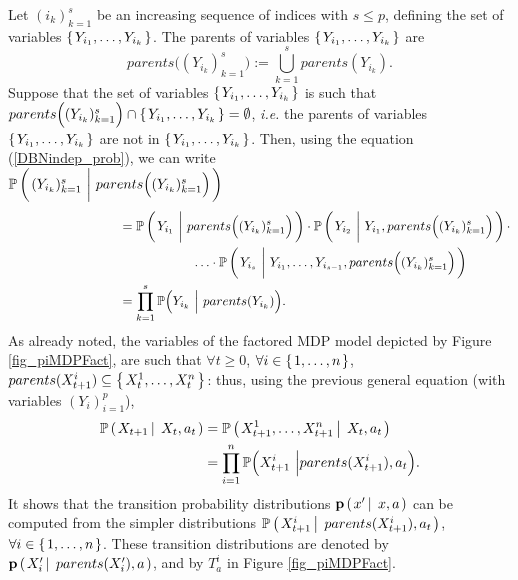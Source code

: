 Let $(i_k)_{k=1}^s$ be an increasing sequence of indices  with $s \leqslant p$,
defining the set of variables $\left\{ \left. Y_{i_1}, \ldots, Y_{i_k} \right. \right\}$.
The parents of variables $\left\{ \left. Y_{i_1}, \ldots, Y_{i_k} \right. \right\}$ are
\[ parents \Big( (Y_{i_k})_{k=1}^s \Big) := \displaystyle \bigcup_{k=1}^s parents(Y_{i_k}). \]
Suppose that the set of variables $\left\{ \left. Y_{i_1}, \ldots, Y_{i_k} \right. \right\}$
is such that %
$parents \Big( (Y_{i_k})_{k=1}^s \Big) \cap \left\{ \left. Y_{i_1},\ldots,Y_{i_k} \right. \right\} = \emptyset$,
\textit{i.e.} the parents of variables $\left\{ \left. Y_{i_1},\ldots,Y_{i_k} \right. \right\}$ 
are not in $\left\{ \left. Y_{i_1},\ldots,Y_{i_k} \right. \right\}$.
Then, using the equation (\ref{DBNindep_prob}),  
we can write \\
$\mathbb{P} \paren{ (Y_{i_k})_{k=1}^s \ \bigg\vert \  parents \Big( (Y_{i_k})_{k=1}^s \Big)  }$
\begin{align*}
\hspace{3cm} &= \mathbb{P} \paren{ Y_{i_1} \ \bigg\vert \  parents \Big( (Y_{i_k})_{k=1}^s \Big)  } \cdot \mathbb{P} \paren{ Y_{i_2} \ \bigg\vert \  Y_{i_1}, parents \Big( (Y_{i_k})_{k=1}^s \Big)  } \cdot \\
&\hspace{2cm} \ldots \cdot \mathbb{P} \paren{ Y_{i_s} \ \bigg\vert \ Y_{i_1}, \ldots, Y_{i_{s-1}},  parents \Big( (Y_{i_k})_{k=1}^s \Big)  }  \\
&= \prod_{k=1}^s \mathbb{P} \Big( Y_{i_k} \ \Big\vert \ parents(Y_{i_k})   \Big).
\end{align*}
As already noted, the variables of the factored MDP model depicted by Figure \ref{fig_piMDPFact},
are such that $\forall t \geqslant 0$, $\forall i \in \left\{ \left. 1,\ldots,n \right. \right\}$, 
$parents(X^i_{t+1}) \subseteq \left\{ \left.  X^1_t,\ldots,X^n_t  \right. \right\}$:
thus, using the previous general equation (with variables $(Y_i)_{i=1}^p$), 
\begin{align*}
\mathbb{P} \left( \left.  X_{t+1} \, \right| \left. \, X_t, a_t  \right. \right) &= \mathbb{P} \left( \left.  X^1_{t+1}, \ldots, X^n_{t+1} \, \right| \left. \, X_t, a_t  \right. \right)\\
&= \prod_{i=1}^{n} \mathbb{P} \Big( X^i_{t+1} \ \Big\vert parents(X^i_{t+1}), a_t \Big). 
\end{align*}
It shows that the transition probability distributions $\textbf{p} \left( \left. x' \, \right| \left. \, x,a \right. \right)$ 
can be computed from the simpler distributions 
$\mathbb{P} \left( \left.  X^i_{t+1} \, \right| \left. \, parents(X^i_{t+1}), a_t   \right. \right)$, $\forall i \in \left\{ \left. 1,\ldots,n \right. \right\}$.
These transition distributions are denoted by $\textbf{p} \left( \left.  X_i' \, \right| \left. \, parents(X_i'), a  \right. \right)$,
and by $T^i_a$ in Figure \ref{fig_piMDPFact}.
 

